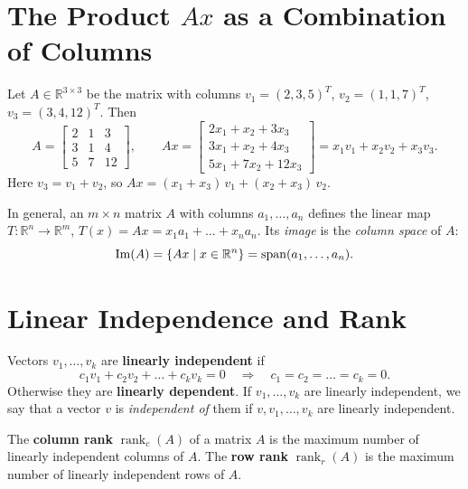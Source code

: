 
\section{The Product \texorpdfstring{$Ax$}{Ax} as a Combination of Columns}

Let $A \in \mathbb{R}^{3 \times 3}$ be the matrix with columns
$v_1 = (2, 3, 5)^{T}$, $v_2 = (1, 1, 7)^{T}$, $v_3 = (3, 4, 12)^{T}$. Then
\begin{equation}\label{eq:columns-0917}
    A = \begin{bmatrix} 2 & 1 & 3 \\ 3 & 1 & 4 \\ 5 & 7 & 12 \end{bmatrix}, \qquad
    Ax = \begin{bmatrix} 2x_1 + x_2 + 3x_3 \\ 3x_1 + x_2 + 4x_3 \\ 5x_1 + 7x_2 + 12x_3 \end{bmatrix}
    = x_1 v_1 + x_2 v_2 + x_3 v_3.
\end{equation}
Here $v_3 = v_1 + v_2$, so $Ax = (x_1 + x_3)\, v_1 + (x_2 + x_3)\, v_2$.

In general, an $m \times n$ matrix $A$ with columns $a_1, \dots, a_n$ defines the linear map
$T \colon \mathbb{R}^n \to \mathbb{R}^m$, $T(x) = Ax = x_1 a_1 + \dots + x_n a_n$. Its \emph{image}
is the \emph{column space} of $A$:
\[\operatorname{Im}(A) = \left\lbrace Ax \mid x \in \mathbb{R}^n\right\rbrace = \operatorname{span}(a_1, \dots, a_n).\]

\section{Linear Independence and Rank}

\begin{definition}
    Vectors $v_1, \dots, v_k$ are \textbf{linearly independent} if
    \[c_1 v_1 + c_2 v_2 + \dots + c_k v_k = 0 \quad\Longrightarrow\quad c_1 = c_2 = \dots = c_k = 0.\]
    Otherwise they are \textbf{linearly dependent}. If $v_1, \dots, v_k$ are linearly independent,
    we say that a vector $v$ is \emph{independent of} them if $v, v_1, \dots, v_k$ are linearly independent.
\end{definition}

\begin{definition}
    The \textbf{column rank} $\operatorname{rank}_c(A)$ of a matrix $A$ is the maximum number of linearly
    independent columns of $A$. The \textbf{row rank} $\operatorname{rank}_r(A)$ is the maximum number of
    linearly independent rows of $A$.
\end{definition}

